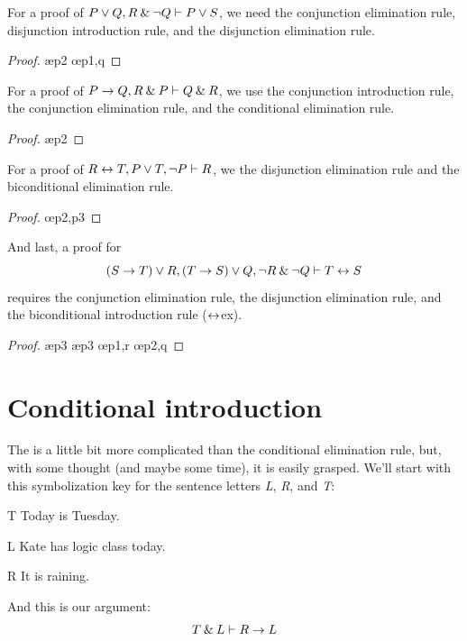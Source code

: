 For a proof of $P \vee Q, R \mathbin{\&} {\neg} Q \vdash P \vee S$, we need the conjunction elimination rule, disjunction introduction rule, and the disjunction elimination rule.
\begin{proof}
	 \pr{}
	 \pr{}
	 \ae{p2}
	 \oe{p1,q}
	 
\end{proof}\medskip

For a proof of $P \rightarrow Q, R \mathbin{\&} P \vdash Q \mathbin{\&} R$, we use the conjunction introduction rule, the conjunction elimination rule, and the conditional elimination rule.
\begin{proof}
	 \pr{}
	 \pr{}
	 \ae{p2}
	 
	 
\end{proof}\medskip

For a proof of $R \leftrightarrow T, P \vee T, {\neg} P \vdash R$, we the disjunction elimination rule and the biconditional elimination rule.
\begin{proof}
	 \pr{}
	 \pr{}
	 \pr{}
	 \oe{p2,p3}
	 
\end{proof}\medskip

And last, a proof for $$(S \rightarrow T) \vee R, (T \rightarrow S) \vee Q, {\neg} R \mathbin{\&} {\neg} Q \vdash T \leftrightarrow S$$ requires the conjunction elimination rule, the disjunction elimination rule, and the biconditional introduction rule ($\leftrightarrow$ex).
\begin{proof}
	 \pr{}
	 \pr{}
	 \pr{}
	 \ae{p3}
	 \ae{p3}
	 \oe{p1,r}
	 \oe{p2,q}
	 
	 
\end{proof}\medskip


\section{Conditional introduction}

The  is a little bit more complicated than the conditional elimination rule, but, with some thought (and maybe some time), it is easily grasped. We'll start with this symbolization key for the sentence letters \textit{L}, \textit{R}, and \textit{T}:
	\begin{ekey}
		\item[T] Today is Tuesday.
		\item[L] Kate has logic class today.
		\item[R] It is raining.
	\end{ekey}
And this is our argument: 
$$T \mathbin{\&} L \vdash R \rightarrow L$$
 
